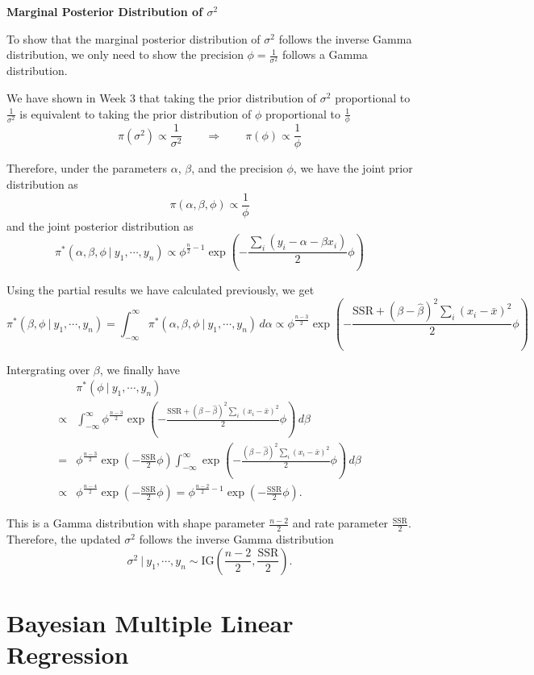 \documentclass[]{book}
\theoremstyle{definition}
\theoremstyle{definition}
\theoremstyle{definition}
\theoremstyle{remark}
\begin{document}
\textbf{Marginal Posterior Distribution of \(\sigma^2\)}

To show that the marginal posterior distribution of \(\sigma^2\) follows
the inverse Gamma distribution, we only need to show the precision
\(\displaystyle \phi = \frac{1}{\sigma^2}\) follows a Gamma
distribution.

We have shown in Week 3 that taking the prior distribution of
\(\sigma^2\) proportional to \(\displaystyle \frac{1}{\sigma^2}\) is
equivalent to taking the prior distribution of \(\phi\) proportional to
\(\displaystyle \frac{1}{\phi}\)
\[ \pi(\sigma^2) \propto \frac{1}{\sigma^2}\qquad \Longrightarrow \qquad \pi(\phi)\propto \frac{1}{\phi} \]

Therefore, under the parameters \(\alpha\), \(\beta\), and the precision
\(\phi\), we have the joint prior distribution as
\[ \pi(\alpha, \beta, \phi) \propto \frac{1}{\phi} \] and the joint
posterior distribution as \[ 
\pi^*(\alpha, \beta, \phi~|~y_1,\cdots,y_n) \propto \phi^{\frac{n}{2}-1}\exp\left(-\frac{\sum_i(y_i-\alpha-\beta x_i)}{2}\phi\right) 
\]

Using the partial results we have calculated previously, we get \[
\pi^*(\beta, \phi~|~y_1,\cdots,y_n) = \int_{-\infty}^\infty \pi^*(\alpha, \beta, \phi~|~y_1,\cdots,y_n)\, d\alpha \propto \phi^{\frac{n-3}{2}}\exp\left(-\frac{\text{SSR}+(\beta-\hat{\beta})^2\sum_i (x_i-\bar{x})^2}{2}\phi\right) 
\]

Intergrating over \(\beta\), we finally have \[
\begin{aligned}
& \pi^*(\phi~|~y_1,\cdots,y_n) \\
\propto & \int_{-\infty}^\infty \phi^{\frac{n-3}{2}}\exp\left(-\frac{\text{SSR}+(\beta-\hat{\beta})^2\sum_i (x_i-\bar{x})^2}{2}\phi\right)\, d\beta\\
= & \phi^{\frac{n-3}{2}}\exp\left(-\frac{\text{SSR}}{2}\phi\right)\int_{-\infty}^\infty \exp\left(-\frac{(\beta-\hat{\beta})^2\sum_i(x_i-\bar{x})^2}{2}\phi\right)\, d\beta\\
\propto & \phi^{\frac{n-4}{2}}\exp\left(-\frac{\text{SSR}}{2}\phi\right) = \phi^{\frac{n-2}{2}-1}\exp\left(-\frac{\text{SSR}}{2}\phi\right).
\end{aligned}
\]

This is a Gamma distribution with shape parameter
\(\displaystyle \frac{n-2}{2}\) and rate parameter
\(\displaystyle \frac{\text{SSR}}{2}\). Therefore, the updated
\(\sigma^2\) follows the inverse Gamma distribution
\[ \sigma^2~|~y_1,\cdots,y_n \sim \text{IG}\left(\frac{n-2}{2}, \frac{\text{SSR}}{2}\right). \]

\section{Bayesian Multiple Linear
Regression}\label{bayesian-multiple-linear-regression}


\end{document}
